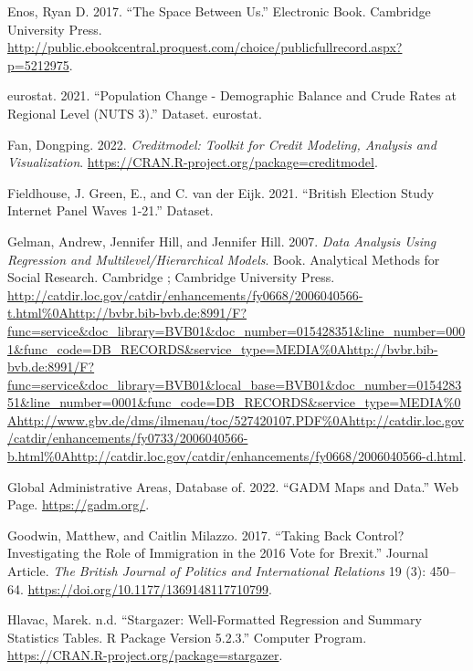 \documentclass{article}
\newlength{\cslhangindent}
\newlength{\cslentryspacingunit} %
\newenvironment{CSLReferences}[2] %
 {%
  \setlength{\parindent}{0pt}
  \ifodd #1
  \let\oldpar\par
  \def\par{\hangindent=\cslhangindent\oldpar}
  \fi
  \setlength{\parskip}{#2\cslentryspacingunit}
 }%
 {}
\begin{document}
\begin{CSLReferences}{1}{0}
\leavevmode{}%
Enos, Ryan D. 2017. {``The Space Between Us.''} Electronic Book.
Cambridge University Press.
\url{http://public.ebookcentral.proquest.com/choice/publicfullrecord.aspx?p=5212975}.

\leavevmode{}%
eurostat. 2021. {``Population Change - Demographic Balance and Crude
Rates at Regional Level (NUTS 3).''} Dataset. eurostat.

\leavevmode{}%
Fan, Dongping. 2022. \emph{Creditmodel: Toolkit for Credit Modeling,
Analysis and Visualization}.
\url{https://CRAN.R-project.org/package=creditmodel}.

\leavevmode{}%
Fieldhouse, J. Green, E., and C. van der Eijk. 2021. {``British Election
Study Internet Panel Waves 1-21.''} Dataset.

\leavevmode{}%
Gelman, Andrew, Jennifer Hill, and Jennifer Hill. 2007. \emph{Data
Analysis Using Regression and Multilevel/Hierarchical Models}. Book.
Analytical Methods for Social Research. Cambridge ; Cambridge University
Press.
\url{http://catdir.loc.gov/catdir/enhancements/fy0668/2006040566-t.html\%0Ahttp://bvbr.bib-bvb.de:8991/F?func=service\&doc_library=BVB01\&doc_number=015428351\&line_number=0001\&func_code=DB_RECORDS\&service_type=MEDIA\%0Ahttp://bvbr.bib-bvb.de:8991/F?func=service\&doc_library=BVB01\&local_base=BVB01\&doc_number=015428351\&line_number=0001\&func_code=DB_RECORDS\&service_type=MEDIA\%0Ahttp://www.gbv.de/dms/ilmenau/toc/527420107.PDF\%0Ahttp://catdir.loc.gov/catdir/enhancements/fy0733/2006040566-b.html\%0Ahttp://catdir.loc.gov/catdir/enhancements/fy0668/2006040566-d.html}.

\leavevmode{}%
Global Administrative Areas, Database of. 2022. {``GADM Maps and
Data.''} Web Page. \url{https://gadm.org/}.

\leavevmode{}%
Goodwin, Matthew, and Caitlin Milazzo. 2017. {``Taking Back Control?
Investigating the Role of Immigration in the 2016 Vote for Brexit.''}
Journal Article. \emph{The British Journal of Politics and International
Relations} 19 (3): 450--64.
\url{https://doi.org/10.1177/1369148117710799}.

\leavevmode{}%
Hlavac, Marek. n.d. {``Stargazer: Well-Formatted Regression and Summary
Statistics Tables. R Package Version 5.2.3.''} Computer Program.
\href{https://CRAN.R-project.org/package=stargazer\%20}{https://CRAN.R-project.org/package=stargazer}.


\end{CSLReferences}
\end{document}
